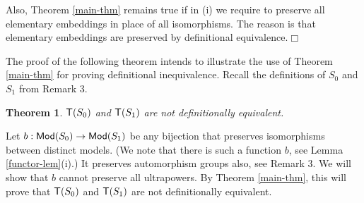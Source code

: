 \documentclass[12pt,leqno]{article}
\newcommand{\T}{\mbox{\sf T}}
\newcommand{\Mod}{\mbox{\sf Mod}}
\newtheorem{thm}{Theorem}
\begin{document}
Also, Theorem \ref{main-thm} remains true if in (i) we require to preserve all 
elementary embeddings in place of all isomorphisms. The reason is that elementary 
embeddings are preserved by definitional equivalence.\quad $\Box$
\bigskip

The proof of the following theorem intends to illustrate the use of Theorem 
\ref{main-thm} for proving definitional inequivalence. Recall the definitions of $S_0$ and $S_1$ from Remark 3.

\begin{thm}\label{postest-cor}
	$\T(S_0)$ and $\T(S_1)$ are not definitionally equivalent.
\end{thm}

	Let $b:\Mod(S_0)\to\Mod(S_1)$ be any bijection that preserves isomorphisms between distinct models. (We note that there is such a function $b$, see Lemma \ref{functor-lem}(i).) It preserves automorphism groups also, see Remark 3. We will show that $b$ cannot preserve all ultrapowers. By Theorem \ref{main-thm}, this will prove that $\T(S_0)$ and $\T(S_1)$ are not definitionally equivalent. 
\end{document}
